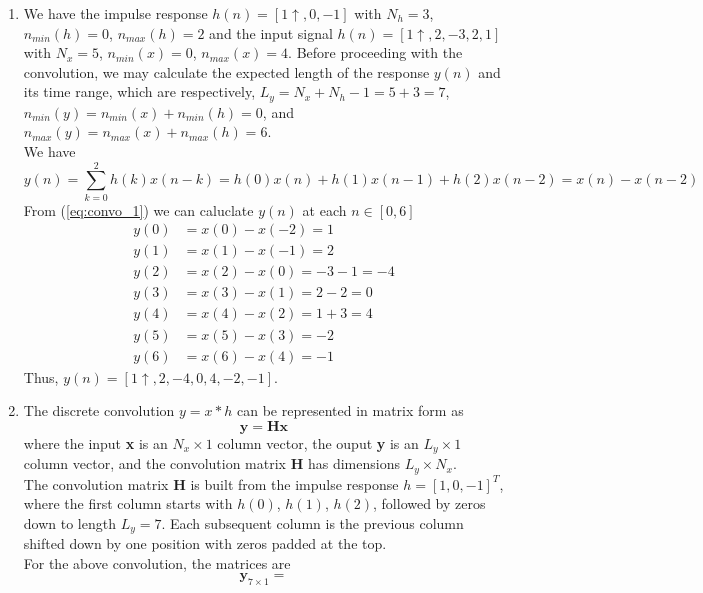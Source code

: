 \documentclass[12pt,a4paper]{article}
\begin{document}
\begin{enumerate}
    \item We have the impulse response $h(n) = [1\uparrow,0,-1]$ with $N_h = 3$, $n_{min}(h) = 0$, $n_{max}(h) = 2$
    and the input signal $h(n) = [1\uparrow,2,-3,2,1]$ with $N_x = 5$, $n_{min}(x) = 0$, $n_{max}(x) = 4$.
    Before proceeding with the convolution, we may calculate the expected length of the response $y(n)$ and its time range,
    which are respectively, $L_y = N_x + N_h -1 = 5 + 3 = 7$, $n_{min}(y) = n_{min}(x) + n_{min}(h) = 0$, and $n_{max}(y) = n_{max}(x) + n_{max}(h) = 6$.\\[1ex]
    We have 
    \begin{equation}\label{eq:convo_1}
        y(n) = \sum_{k=0}^{2} h(k)x(n - k) = h(0)x(n) + h(1)x(n-1)
        + h(2)x(n-2) = x(n) - x(n-2) 
    \end{equation}
    From (\ref{eq:convo_1}) we can caluclate $y(n)$ at each $n\in[0,6]$
    \begin{align*}
        y(0) &= x(0) - x(-2) = 1\\
        y(1) &= x(1) - x(-1) = 2\\
        y(2) &= x(2) - x(0) = -3 - 1 = -4\\
        y(3) &= x(3) - x(1) = 2 - 2 = 0\\
        y(4) &= x(4) - x(2) = 1 + 3 = 4\\
        y(5) &= x(5) - x(3) = -2\\
        y(6) &= x(6) - x(4) = -1
    \end{align*}
    Thus, $y(n)=[1\uparrow,2,-4,0,4,-2,-1]$.
    \item The discrete convolution $y=x*h$ can be represented in matrix form as
    \begin{equation}
        \mathbf{y=Hx}
    \end{equation}
    where the input \textbf{x} is an $N_x \times 1$ column vector, 
    the ouput \textbf{y} is an $L_y\times 1$ column vector,
    and the convolution matrix \textbf{H} has dimensions $L_y\times N_x$.\\[0.5ex]
    The convolution matrix \textbf{H} is built from the impulse response $h=[1,0,-1]^T$, where
    the first column starts with $h(0)$, $h(1)$, $h(2)$, followed by zeros down to length $L_y=7$.
    Each subsequent column is the previous column shifted down by one position with zeros padded at the top.\\[0.5ex]
    For the above convolution, the matrices are
    \begin{equation}\label{eq:matrix_convo}
        \mathbf{y}_{7\times 1}=

\end{equation}
\end{enumerate}
\end{document}
